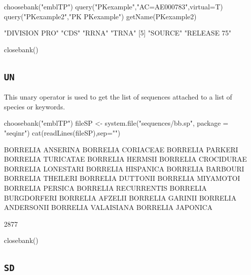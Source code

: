 \documentclass{article}
\begin{document}
\begin{Schunk}
\begin{Sinput}
 choosebank("emblTP")
 query("PKexample","AC=AE000783",virtual=T)
 query("PKexample2","PK PKexample")
 getName(PKexample2)
\end{Sinput}
\begin{Soutput}
[1] "DIVISION PRO" "CDS"          "RRNA"         "TRNA"        
[5] "SOURCE"       "RELEASE 75"  
\end{Soutput}
\begin{Sinput}
 closebank()
\end{Sinput}
\end{Schunk}

\subsection{\texttt{UN}}

This unary operator is used to get the list of sequences attached to a list
of species or keywords.

\begin{Schunk}
\begin{Sinput}
 choosebank("emblTP")
 fileSP <- system.file("sequences/bb.sp", package = "seqinr")
 cat(readLines(fileSP),sep="\n")
\end{Sinput}
\begin{Soutput}
BORRELIA ANSERINA
BORRELIA CORIACEAE
BORRELIA PARKERI
BORRELIA TURICATAE
BORRELIA HERMSII
BORRELIA CROCIDURAE
BORRELIA LONESTARI
BORRELIA HISPANICA
BORRELIA BARBOURI
BORRELIA THEILERI
BORRELIA DUTTONII
BORRELIA MIYAMOTOI
BORRELIA PERSICA
BORRELIA RECURRENTIS
BORRELIA BURGDORFERI
BORRELIA AFZELII
BORRELIA GARINII
BORRELIA ANDERSONII
BORRELIA VALAISIANA
BORRELIA JAPONICA
\end{Soutput}
\begin{Soutput}
[1] 2877
\end{Soutput}
\begin{Sinput}
 closebank()
\end{Sinput}
\end{Schunk}

\subsection{\texttt{SD}}
\end{document}
